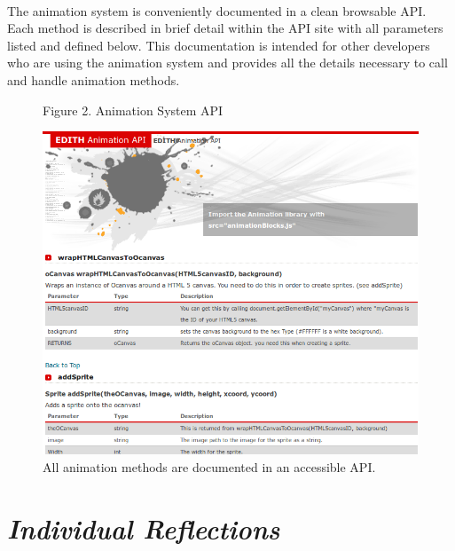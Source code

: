 \documentclass[12pt]{article}
\begin{document}
\paragraph{}
The animation system is conveniently documented in a clean browsable API. Each method is described in brief detail within the API site with all parameters listed and defined below. This documentation is intended for other developers who are using the animation system and provides all the details necessary to call and handle animation methods.
\\
\begin{figure}
\caption{Figure 2. Animation System API}
  \centering
    \includegraphics[scale=.55]{api-screenshot.png}
    \caption*{All animation methods are documented in an accessible API.}
\end{figure}

\newpage
\section{\emph{Individual Reflections}}
\end{document}

